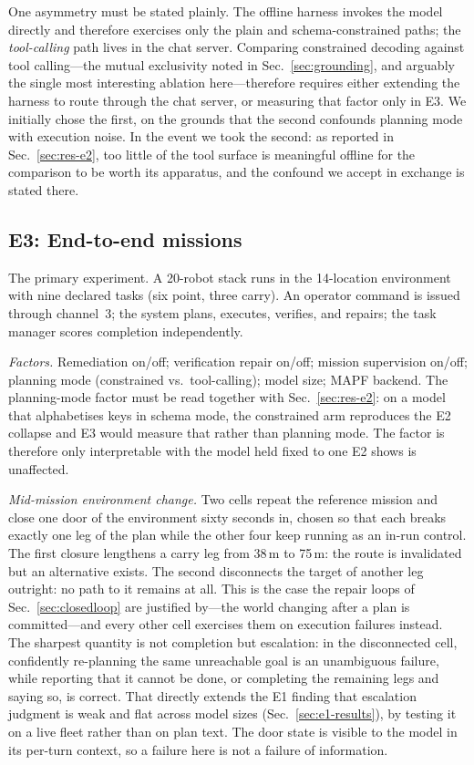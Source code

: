 \documentclass[10pt,twocolumn]{article}
\begin{document}
One asymmetry must be stated plainly. The offline harness invokes the model
directly and therefore exercises only the plain and schema-constrained paths;
the \emph{tool-calling} path lives in the chat server. Comparing constrained
decoding against tool calling---the mutual exclusivity noted in
Sec.~\ref{sec:grounding}, and arguably the single most interesting ablation
here---therefore requires either extending the harness to route through the
chat server, or measuring that factor only in E3. We initially chose the
first, on the grounds that the second confounds planning mode with execution
noise. In the event we took the second: as reported in
Sec.~\ref{sec:res-e2}, too little of the tool surface is meaningful offline
for the comparison to be worth its apparatus, and the confound we accept in
exchange is stated there.

\subsection{E3: End-to-end missions}
\label{sec:e3}

The primary experiment. A 20-robot stack runs in the 14-location environment
with nine declared tasks (six point, three carry). An operator command is
issued through channel~3; the system plans, executes, verifies, and repairs;
the task manager scores completion independently.

\emph{Factors.} Remediation on/off; verification repair on/off; mission
supervision on/off; planning mode (constrained vs.\ tool-calling); model size;
MAPF backend. The planning-mode factor must be read together with
Sec.~\ref{sec:res-e2}: on
a model that alphabetises keys in schema mode, the constrained arm reproduces
the E2 collapse and E3 would measure that rather than planning mode. The
factor is therefore only interpretable with the model held fixed to one E2
shows is unaffected.

\emph{Mid-mission environment change.} Two cells repeat the reference mission
and close one door of the environment sixty seconds in, chosen so that each
breaks exactly one leg of the plan while the other four keep running as an
in-run control. The first closure lengthens a carry leg from 38\,m to 75\,m: the
route is invalidated but an alternative exists. The second disconnects the
target of another leg outright: no path to it remains at all. This is the case
the repair loops of Sec.~\ref{sec:closedloop} are justified by---the world
changing after a plan is committed---and every other cell exercises them on
execution failures instead. The sharpest quantity is not completion but
escalation: in the disconnected cell, confidently re-planning the same
unreachable goal is an unambiguous failure, while reporting that it cannot be
done, or completing the remaining legs and saying so, is correct. That directly
extends the E1 finding that escalation judgment is weak and flat across model
sizes (Sec.~\ref{sec:e1-results}), by testing it on a live fleet rather than on
plan text. The door state is visible to the model in its per-turn context, so a
failure here is not a failure of information.
\end{document}
